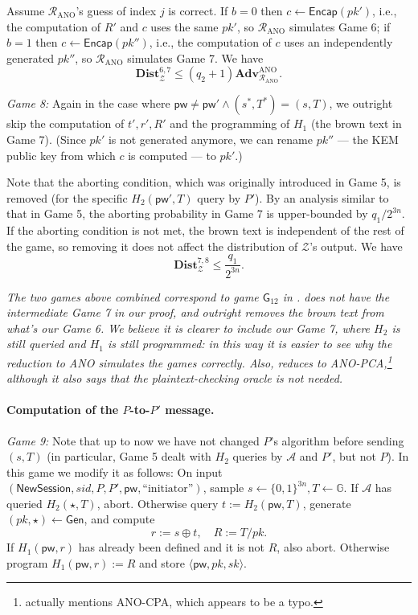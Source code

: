 \documentclass{article}
\theoremstyle{plain}
\theoremstyle{definition}
\theoremstyle{remark}
\newcommand{\group}{\mathbb{G}}
\newcommand{\adv}{\mathcal{A}}
\newcommand{\env}{\mathcal{Z}}
\newcommand{\red}{\mathcal{R}}
\newcommand{\Adv}{\mathbf{Adv}}
\newcommand{\Dist}{\mathbf{Dist}}
\newcommand{\Gen}{\mathsf{Gen}}
\newcommand{\Encap}{\mathsf{Encap}}
\newcommand{\pw}{\mathsf{pw}}
\newcommand{\NewSession}{\mathsf{NewSession}}
\begin{document}
Assume $\red_\text{ANO}$'s guess of index $j$ is correct. If $b = 0$ then $c \gets \Encap(pk')$, i.e., the computation of $R'$ and $c$ uses the same $pk'$, so $\red_\text{ANO}$ simulates Game 6; if $b = 1$ then $c \gets \Encap(pk'')$, i.e., the computation of $c$ uses an independently generated $pk''$, so $\red_\text{ANO}$ simulates Game 7. We have
\[
\Dist_\env^{6,7} \leq (q_2+1)\Adv_{\red_\text{ANO}}^\text{ANO}.
\]

\medskip\noindent\emph{Game 8:} Again in the case where $\pw \neq \pw' \land (s^*,T^*) = (s,T)$, we outright skip the computation of $t',r',R'$ and the programming of $H_1$ (the {\color{brown}brown} text in Game 7). (Since $pk'$ is not generated anymore, we can rename $pk''$ --- the KEM public key from which $c$ is computed --- to $pk'$.)

Note that the aborting condition, which was originally introduced in Game 5, is removed (for the specific $H_2(\pw',T)$ query by $P'$). By an analysis similar to that in Game 5, the aborting probability in Game 7 is upper-bounded by $q_1/2^{3n}$. If the aborting condition is not met, the {\color{brown}brown} text is independent of the rest of the game, so removing it does not affect the distribution of $\env$'s output. We have
\[
\Dist_\env^{7,8} \leq \frac{q_1}{2^{3n}}.
\]

\emph{{\color{red}The two games above combined correspond to game $\mathsf{G}_{12}$ in \cite{EPRINT:ArrBarJar25}. \cite{EPRINT:ArrBarJar25} does not have the intermediate Game 7 in our proof, and outright removes the brown text from what's our Game 6. We believe it is clearer to include our Game 7, where $H_2$ is still queried and $H_1$ is still programmed: in this way it is easier to see why the reduction to ANO simulates the games correctly. Also, \cite{EPRINT:ArrBarJar25} reduces to ANO-PCA,\footnote{\cite{EPRINT:ArrBarJar25} actually mentions ANO-CPA, which appears to be a typo.} although it also says that the plaintext-checking oracle is not needed.}}

\paragraph{Computation of the $P$-to-$P'$ message.}
\mbox{}

\medskip\noindent\emph{Game 9:} Note that up to now we have not changed $P$'s algorithm before sending $(s,T)$ (in particular, Game 5 dealt with $H_2$ queries by $\adv$ and $P'$, but not $P$). In this game we modify it as follows: On input $(\NewSession, sid, P, P', \pw, \text{``initiator''})$, sample $s \gets \{0,1\}^{3n}, T \gets \group$. If $\adv$ has queried $H_2(\star,T)$, abort. {\color{brown}Otherwise query $t := H_2(\pw,T)$, generate $(pk,\star) \gets \Gen$, and compute
\[
r := s \oplus t, \quad R := T/pk.
\]
If $H_1(\pw,r)$ has already been defined and it is not $R$, also abort. Otherwise program $H_1(\pw,r) := R$ and store $\langle\pw,pk,sk\rangle$.}
\end{document}
